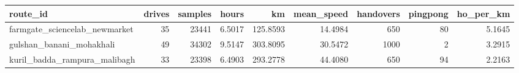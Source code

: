 \begin{tabular}{lrrrrrrrr}
\toprule
route\_id & drives & samples & hours & km & mean\_speed & handovers & pingpong & ho\_per\_km \\
\midrule
farmgate\_sciencelab\_newmarket & 35 & 23441 & 6.5017 & 125.8593 & 14.4984 & 650 & 80 & 5.1645 \\
gulshan\_banani\_mohakhali & 49 & 34302 & 9.5147 & 303.8095 & 30.5472 & 1000 & 2 & 3.2915 \\
kuril\_badda\_rampura\_malibagh & 33 & 23398 & 6.4903 & 293.2778 & 44.4080 & 650 & 94 & 2.2163 \\
\bottomrule
\end{tabular}
